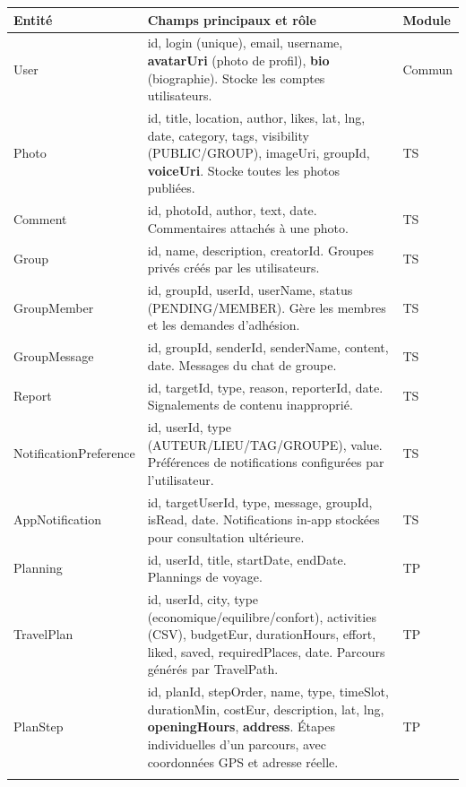 \documentclass[a4paper,12pt,openany]{report}
\begin{document}
\begin{longtable}{>{\ttfamily\small}l >{\small}p{6.5cm} >{\centering\small}p{1.8cm}}
  \toprule
  \normalfont\textbf{Entité} & \textbf{Champs principaux et rôle} & \textbf{Module} \\
  \midrule
  \endhead
  User
    & id, login (unique), email, username,
      \textbf{avatarUri} (photo de profil), \textbf{bio} (biographie).
      Stocke les comptes utilisateurs.
    & Commun \\
  Photo
    & id, title, location, author, likes, lat, lng, date,
      category, tags, visibility (PUBLIC/GROUP), imageUri,
      groupId, \textbf{voiceUri}.
      Stocke toutes les photos publiées.
    & TS \\
  Comment
    & id, photoId, author, text, date.
      Commentaires attachés à une photo.
    & TS \\
  Group
    & id, name, description, creatorId.
      Groupes privés créés par les utilisateurs.
    & TS \\
  GroupMember
    & id, groupId, userId, userName, status (PENDING/MEMBER).
      Gère les membres et les demandes d'adhésion.
    & TS \\
  GroupMessage
    & id, groupId, senderId, senderName, content, date.
      Messages du chat de groupe.
    & TS \\
  Report
    & id, targetId, type, reason, reporterId, date.
      Signalements de contenu inapproprié.
    & TS \\
  NotificationPreference
    & id, userId, type (AUTEUR/LIEU/TAG/GROUPE), value.
      Préférences de notifications configurées par l'utilisateur.
    & TS \\
  AppNotification
    & id, targetUserId, type, message, groupId, isRead, date.
      Notifications in-app stockées pour consultation ultérieure.
    & TS \\
  Planning
    & id, userId, title, startDate, endDate.
      Plannings de voyage.
    & TP \\
  TravelPlan
    & id, userId, city, type (economique/equilibre/confort),
      activities (CSV), budgetEur, durationHours, effort,
      liked, saved, requiredPlaces, date.
      Parcours générés par TravelPath.
    & TP \\
  PlanStep
    & id, planId, stepOrder, name, type, timeSlot, durationMin,
      costEur, description, lat, lng, \textbf{openingHours}, \textbf{address}.
      Étapes individuelles d'un parcours, avec coordonnées GPS et adresse réelle.
    & TP \\
  \bottomrule
  \multicolumn{3}{l}{\small TS = TravelShare \quad TP = TravelPath}
\end{longtable}
\end{document}

